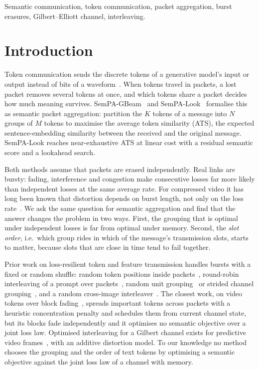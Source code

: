 \documentclass[journal,onecolumn,11pt,draftclsnofoot]{IEEEtran}
\begin{document}
\begin{IEEEkeywords}
Semantic communication, token communication, packet aggregation, burst erasures, Gilbert--Elliott channel, interleaving.
\end{IEEEkeywords}

\section{Introduction}

Token communication sends the discrete tokens of a generative model's input or output instead of bits of a waveform~\cite{qiao2025tokcom}. When tokens travel in packets, a lost packet removes several tokens at once, and which tokens share a packet decides how much meaning survives. SemPA-GBeam~\cite{lee2025gbeam} and SemPA-Look~\cite{lee2026look} formalise this as semantic packet aggregation: partition the $K$ tokens of a message into $N$ groups of $M$ tokens to maximise the average token similarity (ATS), the expected sentence-embedding similarity between the received and the original message. SemPA-Look reaches near-exhaustive ATS at linear cost with a residual semantic score and a lookahead search.

Both methods assume that packets are erased independently. Real links are bursty: fading, interference and congestion make consecutive losses far more likely than independent losses at the same average rate. For compressed video it has long been known that distortion depends on burst length, not only on the loss rate~\cite{liang2003burst}. We ask the same question for semantic aggregation and find that the answer changes the problem in two ways. First, the grouping that is optimal under independent losses is far from optimal under memory. Second, the \emph{slot order}, i.e.\ which group rides in which of the message's transmission slots, starts to matter, because slots that are close in time tend to fail together.

Prior work on loss-resilient token and feature transmission handles bursts with a fixed or random shuffle: random token positions inside packets~\cite{qiao2025tokcom}, round-robin interleaving of a prompt over packets~\cite{hu2026tokcode}, random unit grouping~\cite{yang2025partition} or strided channel grouping~\cite{wei2026everypacket}, and a random cross-image interleaver~\cite{wang2025sitp}. The closest work, on video tokens over block fading~\cite{xie2026videotoken}, spreads important tokens across packets with a heuristic concentration penalty and schedules them from current channel state, but its blocks fade independently and it optimises no semantic objective over a joint loss law. Optimised interleaving for a Gilbert channel exists for predictive video frames~\cite{isc2005}, with an additive distortion model. To our knowledge no method chooses the grouping and the order of text tokens by optimising a semantic objective against the joint loss law of a channel with memory.
\end{document}
